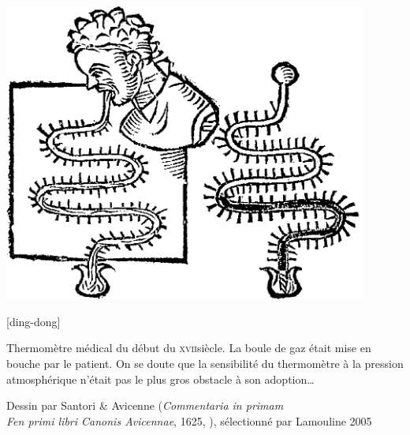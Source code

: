 {\begin{landscape}
\begin{minipage}[b]{0.45\linewidth}
	\label{fig_thermometre_air}
\end{minipage}\hspace{1cm}%
\begin{minipage}[b]{0.45\linewidth}
	\begin{center}
		\includegraphics[width=0.9\textwidth]{images/thermometre_medical_1625.png}
	\end{center}
	\captionsetup{singlelinecheck=off}
   [ding-dong]{Thermomètre médical du début du \textsc{xvii}\ieme siècle. La boule de gaz était mise en bouche par le patient. On se doute que la sensibilité du thermomètre à la pression atmosphérique n’était pas le plus gros obstacle à son adoption…\begin{credits}Dessin par Santori \& Avicenne (\textit{Commentaria in primam\\ Fen primi libri Canonis Avicennae}, 1625, \pd), sélectionné par Lamouline 2005~\cite{lamouline2005}\end{credits}}
	\label{fig_thermometre_medical}
\end{minipage}
\end{landscape}
}%

